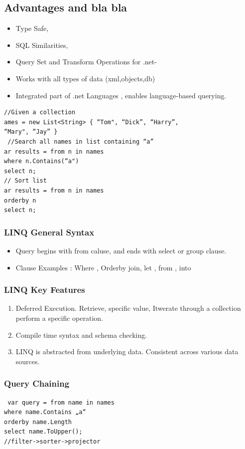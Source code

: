 \documentclass[a4paper,10pt]{scrartcl}
\begin{document}
\subsection{Advantages and bla bla}
\begin{itemize}
 \item Type Safe,
 \item SQL Similarities,
 \item Query Set and Transform Operations for .net-
 \item Works with all types of data (xml,objects,db)
 \item Integrated part of .net Languages , enables language-based querying.
 
\end{itemize}

\begin{lstlisting}[caption=basic LINQ Examples]
  //Given a collection
ames = new List<String> { “Tom", “Dick”, “Harry”,
“Mary", “Jay” }
 //Search all names in list containing “a”
ar results = from n in names
where n.Contains(“a")
select n;
// Sort list
ar results = from n in names
orderby n
select n;

\end{lstlisting}

\subsubsection{LINQ General Syntax}
\begin{itemize}
 \item Query begins with from caluse, and ends with select or group clause.
 \item Clause Examples : Where , Orderby join, let , from , into
\end{itemize}
\subsubsection{LINQ Key Features}
\begin{enumerate}
 \item Deferred Execution. Retrieve, specific value, Itwerate through a collection perform a specific operation.
 \item Compile time syntax and schema checking.
 \item LINQ is abstracted from underlying data. Consistent across various data sources.
\end{enumerate}

\subsubsection{Query Chaining}
\begin{lstlisting}
 var query = from name in names
where name.Contains „a“
orderby name.Length
select name.ToUpper();
//filter->sorter->projector
\end{lstlisting}
\end{document}
